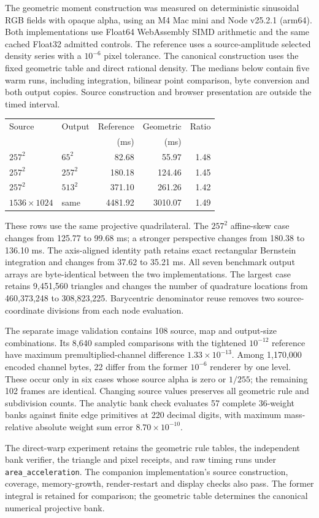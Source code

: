 The geometric moment construction was measured on deterministic sinusoidal
RGB fields with opaque alpha, using an M4 Mac mini and Node v25.2.1 (arm64).
Both implementations use Float64 WebAssembly SIMD arithmetic and the same
cached Float32 admitted controls. The reference uses a source-amplitude
selected density series with a $10^{-6}$ pixel tolerance. The canonical
construction uses the fixed geometric table and direct rational density.
The medians below contain five warm runs, including integration, bilinear
point comparison, byte conversion and both output copies. Source construction
and browser presentation are outside the timed interval.

\begin{center}
\small
\begin{tabular}{llrrr}
\toprule
Source & Output & Reference & Geometric & Ratio \\
 & & (ms) & (ms) & \\
\midrule
$257^2$ & $65^2$ & 82.68 & 55.97 & 1.48 \\
$257^2$ & $257^2$ & 180.18 & 124.46 & 1.45 \\
$257^2$ & $513^2$ & 371.10 & 261.26 & 1.42 \\
$1536\!\times\!1024$ & same & 4481.92 & 3010.07 & 1.49 \\
\bottomrule
\end{tabular}
\end{center}

These rows use the same projective quadrilateral. The $257^2$ affine-skew
case changes from 125.77 to 99.68 ms; a stronger perspective changes from
180.38 to 136.10 ms. The axis-aligned identity path retains exact rectangular
Bernstein integration and changes from 37.62 to 35.21 ms. All seven benchmark
output arrays are byte-identical between the two implementations.
The largest case retains 9,451,560 triangles and changes the number of
quadrature locations from 460,373,248 to 308,823,225. Barycentric denominator
reuse removes two source-coordinate divisions from each node evaluation.

The separate image validation contains 108 source, map and output-size
combinations. Its 8,640 sampled comparisons with the tightened $10^{-12}$
reference have maximum premultiplied-channel difference
$1.33\times10^{-13}$. Among 1,170,000 encoded channel bytes, 22 differ from
the former $10^{-6}$ renderer by one level. These occur only in six cases
whose source alpha is zero or $1/255$; the remaining 102 frames are identical.
Changing source values preserves all geometric rule and subdivision counts.
The analytic bank check evaluates 57 complete 36-weight banks against finite
edge primitives at 220 decimal digits, with maximum mass-relative absolute
weight sum error $8.70\times10^{-10}$.

The direct-warp experiment retains the geometric rule tables, the independent
bank verifier, the triangle and pixel receipts, and raw timing runs under
\texttt{area\_acceleration}. The companion implementation's source construction,
coverage, memory-growth, render-restart and display checks also pass.
The former integral is retained for comparison; the geometric table determines
the canonical numerical projective bank.
